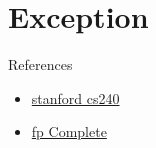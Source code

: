 \chapter{Exception}

References

\begin{itemize}
    \item \href{http://www.scs.stanford.edu/16wi-cs240h/slides/concurrency-slides.html#(1)}{stanford cs240}
    \item \href{https://www.fpcomplete.com/blog/defining-exceptions-in-haskell}{fp Complete}
\end{itemize}

